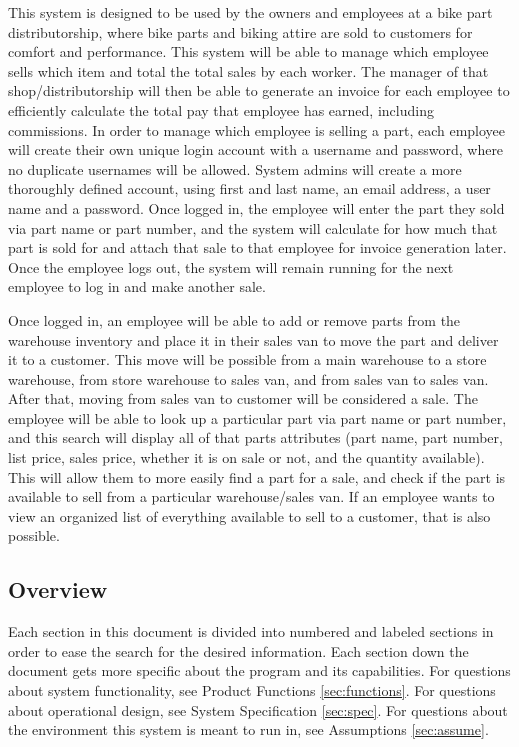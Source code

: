 \documentclass{report}
\begin{document}
This system is designed to be used by the owners and employees at a bike part distributorship, where bike parts and biking attire are sold to customers for comfort and performance. This system will be able to manage which employee sells which item and total the total sales by each worker. The manager of that shop/distributorship will then be able to generate an invoice for each employee to efficiently calculate the total pay that employee has earned, including commissions. In order to manage which employee is selling a part, each employee will create their own unique login account with a username and password, where no duplicate usernames will be allowed. System admins will create a more thoroughly defined account, using first and last name, an email address, a user name and a password. Once logged in, the employee will enter the part they sold via part name or part number, and the system will calculate for how much that part is sold for and attach that sale to that employee for invoice generation later. Once the employee logs out, the system will remain running for the next employee to log in and make another sale.\par
Once logged in, an employee will be able to add or remove parts from the warehouse inventory and place it in their sales van to move the part and deliver it to a customer. This move will be possible from a main warehouse to a store warehouse, from store warehouse to sales van, and from sales van to sales van. After that, moving from sales van to customer will be considered a sale. The employee will be able to look up a particular part via part name or part number, and this search will display all of that parts attributes (part name, part number, list price, sales price, whether it is on sale or not, and the quantity available). This will allow them to more easily find a part for a sale, and check if the part is available to sell from a particular warehouse/sales van. If an employee wants to view an organized list of everything available to sell to a customer, that is also possible.\par

\subsection{Overview}
\label{sec:overview}

Each section in this document is divided into numbered and labeled sections in order to ease the search for the desired information. Each section down the document gets more specific about the program and its capabilities. For questions about system functionality, see Product Functions \ref{sec:functions}. For questions about operational design, see System Specification \ref{sec:spec}. For questions about the environment this system is meant to run in, see Assumptions \ref{sec:assume}.\par
\end{document}
